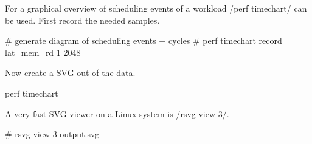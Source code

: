 For a graphical overview of scheduling events of a workload /perf timechart/ can
be used. First record the needed samples.

\starttyping
# generate diagram of scheduling events + cycles
# perf timechart record  lat_mem_rd 1 2048
\stoptyping

Now create a SVG out of the data.

\starttyping
perf timechart
\stoptyping

A very fast SVG viewer on a Linux system is /rsvg-view-3/.

\starttyping
# rsvg-view-3 output.svg
\stoptyping


\startplacefigure[title={Sched}]
\externalfigure[sched][fullwidth]
\stopplacefigure

